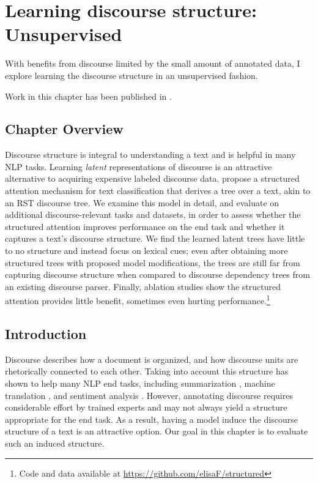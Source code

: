 \chapter{Learning discourse structure: Unsupervised}
\label{ch:latent}
With benefits from discourse limited by the small amount of annotated data, I explore learning the discourse structure in an unsupervised fashion.

Work in this chapter has been published in .

\section{Chapter Overview}
Discourse structure is integral to understanding a text and is helpful in many NLP tasks. Learning \emph{latent} representations of discourse is an attractive alternative to acquiring expensive labeled discourse data.
\citet{Liu:2018} propose a structured attention mechanism for text classification that derives a tree over a text, akin to an RST discourse tree. We examine this model in detail, and evaluate on additional discourse-relevant tasks and datasets, in order to assess whether the structured attention improves performance on the end task and whether it captures a text's discourse structure. We find the learned latent trees have little to no structure and instead focus on lexical cues; even after obtaining more structured trees with proposed model modifications, the trees are still far from capturing discourse structure when compared to discourse dependency trees from an existing discourse parser. Finally, ablation studies show the structured attention provides little benefit, sometimes even hurting performance.\footnote{Code and data available at \url{https://github.com/elisaF/structured}}

\section{Introduction}
Discourse describes how a document is organized, and how discourse units are rhetorically connected to each other. 
Taking into account this structure has shown to help many NLP end tasks, including summarization \cite{Hirao:2013,Durrett:2016}, machine translation \cite{Joty:2017}, and sentiment analysis \cite{Ji:2017}. However, annotating discourse requires considerable effort by trained experts and may not always yield a structure appropriate for the end task. As a result, having a model induce the discourse structure of a text is an attractive option. Our goal in this chapter is to evaluate such an induced structure. 

